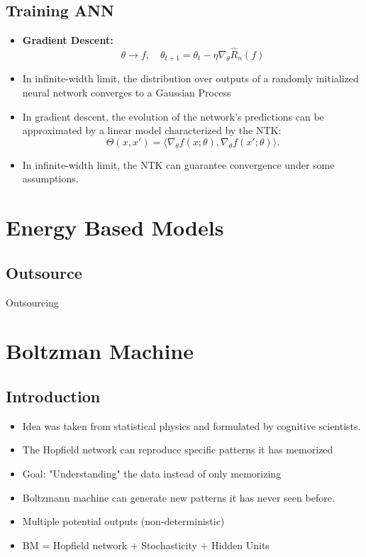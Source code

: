 \documentclass{antclass}
\begin{document}
\section{Training ANN}
\begin{itemize}
	
\item \textbf{Gradient Descent:}
\[
\theta\to f, \quad \theta_{t+1} = \theta_t - \eta \nabla_\theta \hat{R}_n(f)
\]


\item In infinite-width limit, the distribution over outputs of a randomly initialized neural network converges to a Gaussian Process%
\item In gradient descent, the evolution of the network’s predictions can be approximated by a linear model characterized by the NTK:
\[
\Theta(x,x') = \langle \nabla_\theta f(x;\theta), \nabla_\theta f(x';\theta) \rangle.
\]
\item In infinite-width limit, the NTK can guarantee convergence under some assumptions.
\end{itemize}
 





\chapter{Energy Based Models}
\section{Outsource}

Outsourcing

\chapter{Boltzman Machine}
\section{Introduction}
\begin{itemize}
 	\item Idea was taken from statistical physics and formulated by cognitive scientists.
	
	\item The Hopfield network can reproduce specific patterns it has memorized
 	
 	\item Goal: "Understanding" the data instead of only memorizing
 	
 	\item Boltzmann machine can generate new patterns it has never seen before.
 	\item Multiple potential outputs (non-deterministic)
 	
 	\item BM = Hopfield network + Stochasticity + Hidden Units

 
\end{itemize}
\end{document}
